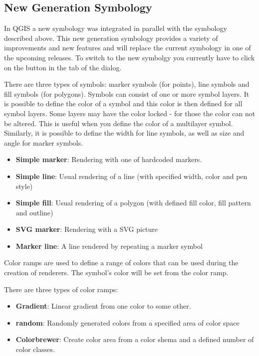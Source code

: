 \subsection{New Generation Symbology}

In QGIS \CURRENT a new symbology was integrated in parallel with the symbology 
described above. This new generation symbology provides a variety of improvements and 
new features and will replace the current symbology in one of the upcoming releases. 
To switch to the new symbolgy you currently have to click on the  button in the  tab of the  dialog.  


There are three types of symbols: marker symbols (for points), line symbols and 
fill symbols (for polygons). Symbols can consist of one or more symbol layers. It 
is possible to define the color of a symbol and this color is then defined for all 
symbol layers. Some layers may have the color locked - for those the color can not 
be altered. This is useful when you define the color of a multilayer symbol. 
Similarly, it is possible to define the width for line symbols, as well as size and 
angle for marker symbols.


\begin{itemize}
\item \textbf{Simple marker}: Rendering with one of hardcoded markers.
\item \textbf{Simple line}: Usual rendering of a line (with specified 
width, color and pen style) 
\item \textbf{Simple fill}: Usual rendering of a polygon (with defined 
fill color, fill pattern and outline) 
\item \textbf{SVG marker}: Rendering with a SVG picture 
\item \textbf{Marker line}: A line rendered by repeating a marker symbol 
\end{itemize}


Color ramps are used to define a range of colors that can be used during 
the creation of renderers. The symbol's color will be set from the color ramp. 

There are three types of color ramps:

\begin{itemize}
\item \textbf{Gradient}: Linear gradient from one color to some other.
\item \textbf{random}: Randomly generated colors from a specified area of 
color space 
\item \textbf{Colorbrewer}: Create color area from a color shema and a defined 
number of color classes.
\end{itemize}

